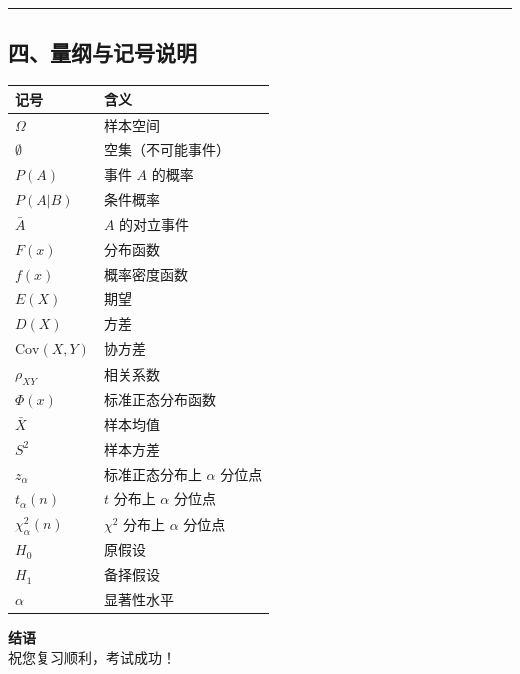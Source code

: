 \documentclass[12pt,a4paper]{ctexart}
\begin{document}
\vspace{1em}\hrule\vspace{1em}

\subsection{四、量纲与记号说明}

\begin{center}
    \begin{tabular}{@{}ll@{}}
        \toprule
        \textbf{记号}          & \textbf{含义}               \\ \midrule
        $\Omega$             & 样本空间                      \\
        $\emptyset$          & 空集（不可能事件）                 \\
        $P(A)$               & 事件 $A$ 的概率                \\
        $P(A|B)$             & 条件概率                      \\
        $\bar{A}$            & $A$ 的对立事件                 \\
        $F(x)$               & 分布函数                      \\
        $f(x)$               & 概率密度函数                    \\
        $E(X)$               & 期望                        \\
        $D(X)$               & 方差                        \\
        $\text{Cov}(X,Y)$    & 协方差                       \\
        $\rho_{XY}$          & 相关系数                      \\
        $\Phi(x)$            & 标准正态分布函数                  \\
        $\bar{X}$            & 样本均值                      \\
        $S^2$                & 样本方差                      \\
        $z_{\alpha}$         & 标准正态分布上 $\alpha$ 分位点      \\
        $t_{\alpha}(n)$      & $t$ 分布上 $\alpha$ 分位点      \\
        $\chi^2_{\alpha}(n)$ & $\chi^2$ 分布上 $\alpha$ 分位点 \\
        $H_0$                & 原假设                       \\
        $H_1$                & 备择假设                      \\
        $\alpha$             & 显著性水平                     \\ \bottomrule
    \end{tabular}
\end{center}

\vspace{3em}
\begin{center}
    \Large \textbf{结语} \\
    \vspace{1em}
    \normalsize 祝您复习顺利，考试成功！
\end{center}
\end{document}

